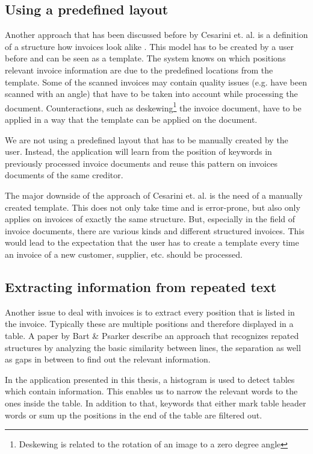 \subsection{Using a predefined layout}
Another approach that has been discussed before by Cesarini et. al. is a definition of a structure how invoices look alike \cite{Cesarini98}. This model has to be created by a user before and can be seen as a template. The system knows on which positions relevant invoice information are due to the predefined locations from the template.
Some of the scanned invoices may contain quality issues (e.g. have been scanned with an angle) that have to be taken into account while processing the document. Counteractions, such as deskewing\footnote{Deskewing is related to the rotation of an image to a zero degree angle} the invoice document, have to be applied in a way that the template can be applied on the document.

We are not using a predefined layout that has to be manually created by the user. Instead, the application will learn from the position of keywords in previously processed invoice documents and reuse this pattern on invoices documents of the same creditor.

The major downside of the approach of Cesarini et. al. \cite{Cesarini98} is the need of a manually created template. This does not only take time and is error-prone, but also only applies on invoices of exactly the same structure. But, especially in the field of invoice documents, there are various kinds and different structured invoices. This would lead to the expectation that the user has to create a template every time an invoice of a new customer, supplier, etc. should be processed.

\subsection{Extracting information from repeated text}
Another issue to deal with invoices is to extract every position that is listed in the invoice. Typically these are multiple positions and therefore displayed in a table. A paper by Bart \& Psarker \cite{Bart10}  describe an approach that recognizes repated structures by analyzing the basic similarity between lines, the separation as well as gaps in between to find out the relevant information.

In the application presented in this thesis, a histogram is used to detect tables which contain information. This enables us to narrow the relevant words to the ones inside the table. In addition to that, keywords that either mark table header words or sum up the positions in the end of the table are filtered out.

